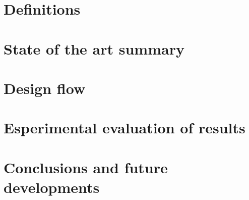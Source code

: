 \documentclass[11pt, a4paper, twoside, openright]{report}
\begin{document}
\chapter{Definitions}


\chapter{State of the art summary}


\chapter{Design flow}


\chapter{Esperimental evaluation of results}


\chapter{Conclusions and future developments}


\setlength{\parskip}{0.3em}
\listoffigures
\listoftables


\printbibliography[heading=bibintoc]
\end{document}
